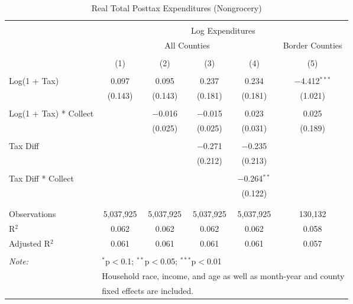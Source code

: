 
\begin{table}[!htbp] \centering 
  \caption{Real Total Posttax Expenditures (Nongrocery)} 
  \label{} 
\begin{tabular}{@{\extracolsep{5pt}}lccccc} 
\\[-1.8ex]\hline 
\hline \\[-1.8ex] 
 & \multicolumn{5}{c}{Log Expenditures} \\ 
\cline{2-6} 
 & \multicolumn{4}{c}{All Counties} & Border Counties \\ 
\\[-1.8ex] & (1) & (2) & (3) & (4) & (5)\\ 
\hline \\[-1.8ex] 
 Log(1 + Tax) & 0.097 & 0.095 & 0.237 & 0.234 & $-$4.412$^{***}$ \\ 
  & (0.143) & (0.143) & (0.181) & (0.181) & (1.021) \\ 
  & & & & & \\ 
 Log(1 + Tax) * Collect &  & $-$0.016 & $-$0.015 & 0.023 & 0.025 \\ 
  &  & (0.025) & (0.025) & (0.031) & (0.189) \\ 
  & & & & & \\ 
 Tax Diff &  &  & $-$0.271 & $-$0.235 &  \\ 
  &  &  & (0.212) & (0.213) &  \\ 
  & & & & & \\ 
 Tax Diff * Collect &  &  &  & $-$0.264$^{**}$ &  \\ 
  &  &  &  & (0.122) &  \\ 
  & & & & & \\ 
\hline \\[-1.8ex] 
Observations & 5,037,925 & 5,037,925 & 5,037,925 & 5,037,925 & 130,132 \\ 
R$^{2}$ & 0.062 & 0.062 & 0.062 & 0.062 & 0.058 \\ 
Adjusted R$^{2}$ & 0.061 & 0.061 & 0.061 & 0.061 & 0.057 \\ 
\hline 
\hline \\[-1.8ex] 
\textit{Note:}  & \multicolumn{5}{l}{$^{*}$p$<$0.1; $^{**}$p$<$0.05; $^{***}$p$<$0.01} \\ 
 & \multicolumn{5}{l}{Household race, income, and age as well as month-year and county} \\ 
 & \multicolumn{5}{l}{fixed effects are included.} \\ 
\end{tabular} 
\end{table} 
